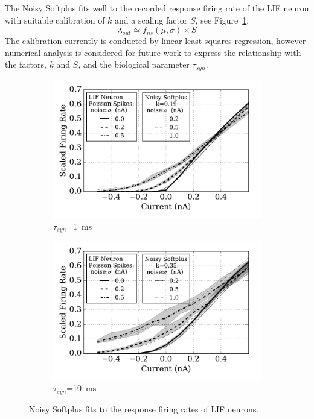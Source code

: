 	
	The Noisy Softplus fits well to the recorded response firing rate of the LIF neuron with suitable calibration of $k$ and a scaling factor $S$, see Figure~\ref{Fig:nsptau1}:
	\begin{equation}
	\lambda_{out} \simeq f_{ns}(\mu, \sigma) \times S
	\label{equ:fit}
	\end{equation}	
	The calibration currently is conducted by linear least squares regression, however numerical analysis is considered for future work to express the relationship with the factors, $k$ and $S$, and the biological parameter $\tau_{syn}$.
		
	\begin{figure}
		\centering
		\begin{subfigure}[t]{0.49\textwidth}
			\includegraphics[width=\textwidth]{pics_iconip/4-1.pdf}
			\caption{$\tau_{syn}$=1~ms}
		\end{subfigure}
		\begin{subfigure}[t]{0.49\textwidth}
			\includegraphics[width=\textwidth]{pics_iconip/4-10.pdf}
			\caption{$\tau_{syn}$=10~ms}
		\end{subfigure}
		\caption{Noisy Softplus fits to the response firing rates of LIF neurons.}
		\label{Fig:nsptau1}
	\end{figure}		
	
